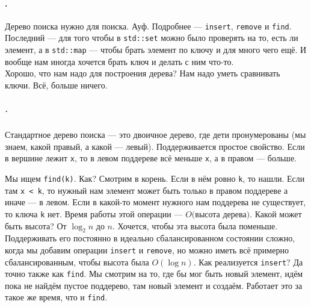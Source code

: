 \documentclass{article}
\newcommand{\pseudo}{PseudoLexer.py:PseudoLexer -x}
\newcommand{\pseudocode}[1]{\texttt{#1}}
\begin{document}
    \paragraph{.}
    Дерево поиска нужно для поиска. Ауф. Подробнее --- \pseudocode{insert}, \pseudocode{remove} и \pseudocode{find}. Последний --- для того чтобы в \texttt{std::set} можно было проверять на то, есть ли элемент, а в \texttt{std::map} --- чтобы брать элемент по ключу и для много чего ещё. И вообще нам иногда хочется брать ключ и делать с ним что-то.\\
    Хорошо, что нам надо для построения дерева? Нам надо уметь сравнивать ключи. Всё, больше ничего.
    \subparagraph{.}
    Стандартное дерево поиска --- это двоичное дерево, где дети пронумерованы (мы знаем, какой правый, а какой --- левый). Поддерживается простое свойство. Если в вершине лежит \pseudocode{x}, то в левом поддереве всё меньше \pseudocode{x}, а в правом --- больше.
    \begin{center}
    \end{center}
    Мы ищем \pseudocode{find(k)}. Как? Смотрим в корень. Если в нём ровно \pseudocode{k}, то нашли. Если там \pseudocode{x < k}, то нужный нам элемент может быть только в правом поддереве а иначе --- в левом. Если в какой-то момент нужного нам поддерева не существует, то ключа \pseudocode{k} нет. Время работы этой операции --- $O($высота дерева$)$. Какой может быть высота? От $\log_2n$ до $n$. Хочется, чтобы эта высота была поменьше. Поддерживать его постоянно в идеально сбалансированном состоянии сложно, когда мы добавим операции \pseudocode{insert} и \pseudocode{remove}, но можно иметь всё примерно сбалансированным, чтобы высота была $O(\log n)$. Как реализуется \pseudocode{insert}? Да точно также как \pseudocode{find}. Мы смотрим на то, где бы мог быть новый элемент, идём пока не найдём пустое поддерево, там новый элемент и создаём. Работает это за такое же время, что и \pseudocode{find}.
\end{document}
